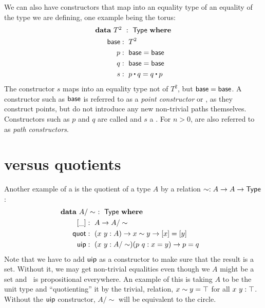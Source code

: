 \documentclass[a4paper,10pt]{report}
\begin{document}
We can also have constructors that map into an equality type of an
equality of the type we are defining, one example being the torus:
%
\begin{alignat*}{2}
  &\rlap{$\data\ T^2\ :\ \Type\ \where$} \\
  &&\ \ \base     &:\ T^2 \\
  &&\ \ p         &:\ \base = \base \\
  &&\ \ q         &:\ \base = \base \\
  &&\ \ s         &:\ p \ct q = q \ct p
\end{alignat*}
%
The constructor $s$ maps into an equality type not of $T^2$, but
$\mathsf{base} = \mathsf{base}$. A constructor such as $\mathsf{base}$ is referred to as a
\emph{point constructor} or \emph{\zeroconstructor}, as they construct
points, but do not introduce any new non-trivial paths
themselves. Constructors such as $p$ and $q$ are called
\emph{\oneconstructors} and $s$ a \emph{}. For
$n > 0$,  are also referred to as \emph{path
  constructors}.

\section{\Hits versus quotients}
\label{sec:quotients}

Another example of a \hit is the quotient of a type $A$ by a relation
$\sim : A \to A \to \mathsf{Type}$:
\begin{alignat*}{2}
  &\rlap{$\data\ A/\sim\ :\ \Type\ \where$} \\
  &&\ \ [\_]  &:\ A \to A/\sim \\
  &&\ \ \quot &:\ (x\ y : A) \to x \sim y \to [ x ] = [ y ] \\
  &&\ \ \uipc  &:\ (x\ y : A/\sim) (p\ q : x = y) \to p = q
\end{alignat*}
%
Note that we have to add $\operatorname{\mathsf{uip}}$ as a constructor to make sure that the
result is a set. Without it, we may get non-trivial equalities even
though we $A$ might be a set and $~$ is propositional everywhere. An
example of this is taking $A$ to be the unit type and ``quotienting''
it by the trivial, relation, \ie $x \sim y = \top$ for all
$x\ y : \top$. Without the $\operatorname{\mathsf{uip}}$ constructor, $A/\sim$ will be
equivalent to the circle.
\end{document}
